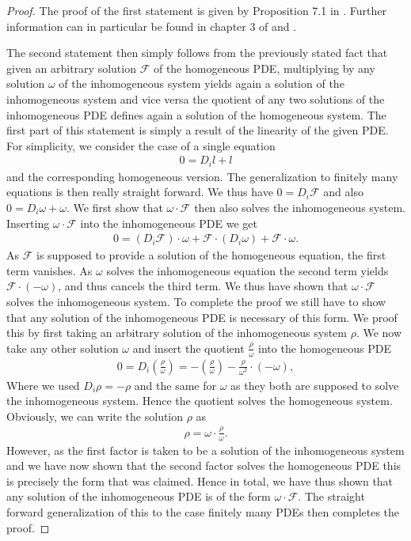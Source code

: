 \begin{proof}
The proof of the first statement is given by Proposition 7.1 in \cite{seiler1994analysis}. Further information can in particular be found in chapter 3 of \cite{seiler2009involution} and \cite{articleCH}. 

The second statement then simply follows from the previously stated fact that given an arbitrary solution $\mathcal{F}$ of the homogeneous PDE, multiplying by any solution $\omega$ of the inhomogeneous system yields again a solution of the inhomogeneous system and vice versa the quotient of any two solutions of the inhomogeneous PDE defines again a solution of the homogeneous system. The first part of this statement is simply a result of the linearity of the given PDE. For simplicity, we consider the case of a single equation 
\begin{align}
    0=D_i l + l 
\end{align}
and the corresponding homogeneous version. The generalization to finitely many equations is then really straight forward. 
We thus have $0 = D_i \mathcal{F}$ and also $0 = D_i \omega + \omega$.
We first show that $\omega \cdot \mathcal{F}$ then also solves the inhomogeneous system. Inserting $\omega \cdot \mathcal{F}$ into the inhomogeneous PDE we get  
\begin{align}
    0 = \left ( D_i \mathcal{F} \right ) \cdot \omega + \mathcal{F} \cdot \left ( D_i \omega \right) + \mathcal{F} \cdot \omega. 
\end{align}
As $\mathcal{F}$ is supposed to provide a solution of the homogeneous equation, the first term vanishes. As $\omega$ solves the inhomogeneous equation the second term yields $\mathcal{F} \cdot \left ( - \omega \right )$,
and thus cancels the third term. We thus have shown that $\omega \cdot \mathcal{F}$ solves the inhomogeneous system. To complete the proof we still have to show that any solution of the inhomogeneous PDE is necessary of this form. We proof this by first taking an arbitrary solution of the inhomogeneous system $\rho$. We now take any other solution $\omega$ and insert the quotient $\frac{\rho}{\omega}$ into the homogeneous PDE
\begin{align}
    0 = D_i \left (\frac{\rho}{\omega} \right) = - (\frac{\rho}{\omega}) - \frac{\rho}{\omega^2} \cdot (-\omega) ,
\end{align}
Where we used $D_i \rho = -\rho$ and the same for $\omega$ as they both are supposed to solve the inhomogeneous system. Hence the quotient solves the homogeneous system. Obviously, we can write the solution $\rho$ as 
\begin{align}
    \rho = \omega \cdot  \frac{\rho}{\omega}.
\end{align}
However, as the first factor is taken to be a solution of the inhomogeneous system and we have now shown that the second factor solves the homogeneous PDE this is precisely the form that was claimed. 
Hence in total, we have thus shown that any solution of the inhomogeneous PDE is of the form $\omega \cdot \mathcal{F}$.
The straight forward generalization of this to the case finitely many PDEs then completes the proof.
\end{proof}
